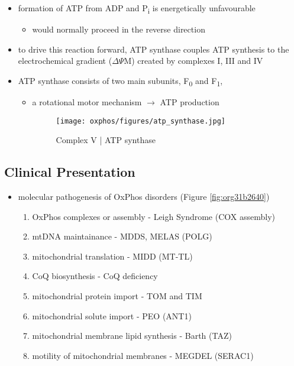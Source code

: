 \documentclass[12pt]{scrartcl}
\begin{document}
{\small{}}

\begin{itemize}
\item formation of ATP from ADP and P\textsubscript{i} is energetically unfavourable
\begin{itemize}
\item would normally proceed in the reverse direction
\end{itemize}

\item to drive this reaction forward, ATP synthase couples ATP synthesis
to the electrochemical gradient (\(\Delta \Psi\)M) created by complexes
I, III and IV
\item ATP synthase consists of two main subunits, F\textsubscript{0} and F\textsubscript{1},
\begin{itemize}
\item a rotational motor mechanism \(\to\) ATP production

\begin{figure}[htbp]
\centering
\texttt{[image: oxphos/figures/atp\_synthase.jpg]}
\caption{\label{fig:org515bcd2}Complex V | ATP synthase}
\end{figure}
\end{itemize}
\end{itemize}

\subsection{Clinical Presentation}
\label{sec:orgca0e5d3}
\begin{itemize}
\item molecular pathogenesis of OxPhos disorders (Figure \ref{fig:org31b2640})
\begin{enumerate}
\item OxPhos complexes or assembly - Leigh Syndrome (COX assembly)
\item mtDNA maintainance - MDDS, MELAS (POLG)
\item mitochondrial translation - MIDD (MT-TL)
\item CoQ biosynthesis - CoQ deficiency
\item mitochondrial protein import - TOM and TIM
\item mitochondrial solute import - PEO (ANT1)
\item mitochondrial membrane lipid synthesis - Barth (TAZ)
\item motility of mitochondrial membranes - MEGDEL (SERAC1)
\end{enumerate}
\end{itemize}
\end{document}
